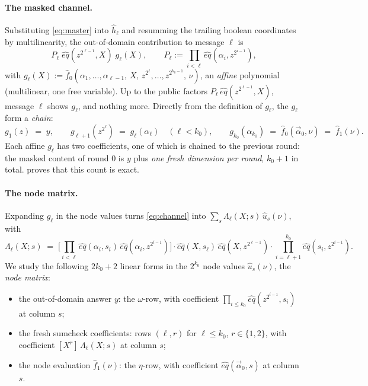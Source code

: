 \documentclass{article}
\theoremstyle{definition}
\begin{document}
\paragraph{The masked channel.} Substituting \cref{eq:master} into $\hat{h}_\ell$ and resumming the trailing boolean coordinates by multilinearity, the out-of-domain contribution to message $\ell$ is
\begin{equation}\label{eq:channel}
P_\ell\; \hat{eq}(z^{2^{\ell-1}}, X)\; g_\ell(X) , \qquad P_\ell := \prod_{i < \ell} \hat{eq}(\alpha_i, z^{2^{i-1}}) ,
\end{equation}
with $g_\ell(X) := \hat{f}_0(\alpha_1, \dots, \alpha_{\ell - 1},\, X,\, z^{2^{\ell}}, \dots, z^{2^{k_0-1}},\, \nu)$, an \emph{affine} polynomial (multilinear, one free variable). Up to the public factors $P_\ell\, \hat{eq}(z^{2^{\ell-1}}, X)$, message $\ell$ shows $g_\ell$, and nothing more. Directly from the definition of $g_\ell$, the $g_\ell$ form a \emph{chain}:
\begin{equation}\label{eq:chain}
g_1(z) \;=\; y , \qquad g_{\ell+1}(z^{2^{\ell}}) \;=\; g_\ell(\alpha_\ell) \quad (\ell < k_0) , \qquad g_{k_0}(\alpha_{k_0}) \;=\; \hat{f}_0(\vec{\alpha}_0, \nu) \;=\; \hat{f}_1(\nu) .
\end{equation}
Each affine $g_\ell$ has two coefficients, one of which is chained to the previous round: the masked content of round 0 is $y$ plus \emph{one fresh dimension per round}, $k_0 + 1$ in total.  proves that this count is exact.

\paragraph{The node matrix.} Expanding $g_\ell$ in the node values turns \cref{eq:channel} into $\sum_s \Lambda_\ell(X; s)\, \hat{u}_s(\nu)$, with
\begin{equation}\label{eq:lambda}
\Lambda_\ell(X; s) \;=\; \Big[\prod_{i < \ell} \hat{eq}(\alpha_i, s_i)\, \hat{eq}(\alpha_i, z^{2^{i-1}})\Big] \cdot \hat{eq}(X, s_\ell)\, \hat{eq}(X, z^{2^{\ell-1}}) \cdot \prod_{i = \ell + 1}^{k_0} \hat{eq}(s_i, z^{2^{i-1}}) .
\end{equation}
We study the following $2 k_0 + 2$ linear forms in the $2^{k_0}$ node values $\hat{u}_s(\nu)$, the \emph{node matrix}:
\begin{itemize}
    \item the out-of-domain answer $y$: the $\omega$-row, with coefficient $\prod_{i \le k_0} \hat{eq}(z^{2^{i-1}}, s_i)$ at column $s$;
    \item the fresh sumcheck coefficients: rows $(\ell, r)$ for $\ell \le k_0$, $r \in \{1, 2\}$, with coefficient $[X^r]\, \Lambda_\ell(X; s)$ at column $s$;
    \item the node evaluation $\hat{f}_1(\nu)$: the $\eta$-row, with coefficient $\hat{eq}(\vec{\alpha}_0, s)$ at column $s$.
\end{itemize}
\end{document}
